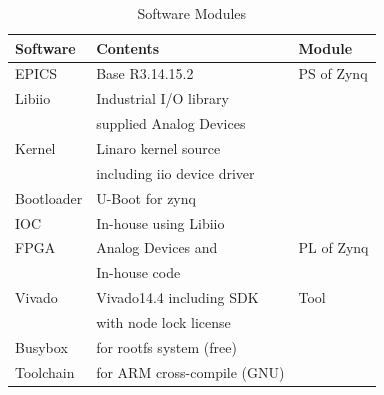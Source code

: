 \documentclass[journal]{IEEEtran}
\begin{document}
\begin{table}[h!t]
	\centering
	\caption{Software Modules}
	\label{sw-conf}
	
	\begin{tabular}{@{}lll@{}}
		
		\hline
		\textbf{Software} & \textbf{Contents}                 & \textbf{Module}     \\
		\hline
		EPICS        & Base R3.14.15.2                       & PS of Zynq            \\
		Libiio       & Industrial I/O library                &                       \\
		& supplied Analog Devices               &                       \\         
		Kernel       & Linaro kernel source                  &                       \\
		& including iio device driver           &                       \\         
		Bootloader   & U-Boot for zynq                       &                       \\
		IOC          & In-house using Libiio                 &                       \\
		
		\hline
		FPGA         & Analog Devices and                    & PL of Zynq            \\
		& In-house code                         &                       \\
		
		\hline
		Vivado       & Vivado14.4 including SDK              & Tool                  \\        
		& with node lock license                &                       \\            
		Busybox      & for rootfs system (free)              &                       \\
		Toolchain    & for ARM cross-compile (GNU)           &                       \\        
		\hline
		
	\end{tabular}
\end{table}
\end{document}

